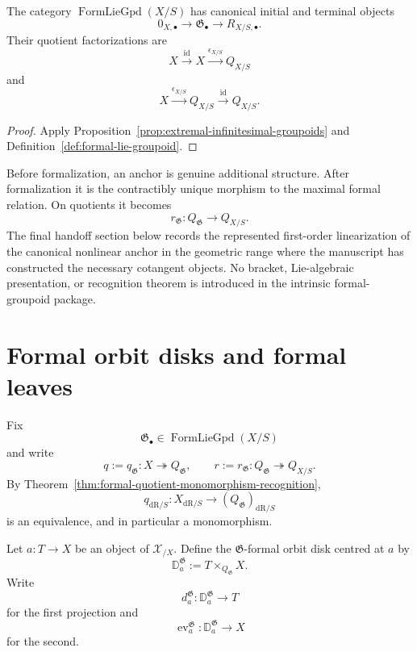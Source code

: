 \begin{corollary}
\label{cor:initial-terminal-formal-gpd}
The category $\operatorname{FormLieGpd}(X/S)$ has canonical initial and
terminal objects
\[
    0_{X,\bullet}
    \longrightarrow
    \mathfrak G_\bullet
    \longrightarrow
    R_{X/S,\bullet}.
\]
Their quotient factorizations are
\[
    X\xrightarrow{\operatorname{id}}X
      \xrightarrow{\epsilon_{X/S}}Q_{X/S}
\]
and
\[
    X\xrightarrow{\epsilon_{X/S}}Q_{X/S}
      \xrightarrow{\operatorname{id}}Q_{X/S}.
\]
\end{corollary}

\begin{proof}
Apply Proposition~\ref{prop:extremal-infinitesimal-groupoids} and
Definition~\ref{def:formal-lie-groupoid}.
\end{proof}

\begin{remark}
\label{rem:nonlinear-anchor}
Before formalization, an anchor is genuine additional structure.  After
formalization it is the contractibly unique morphism to the maximal formal
relation.  On quotients it becomes
\[
    r_{\mathfrak G}:Q_{\mathfrak G}\to Q_{X/S}.
\]
The final handoff section below records the represented first-order
linearization of the canonical nonlinear anchor in the geometric range where
the manuscript has constructed the necessary cotangent objects.  No bracket,
Lie-algebraic presentation, or recognition theorem is introduced in the
intrinsic formal-groupoid package.
\end{remark}


\section{Formal orbit disks and formal leaves}
\label{sec:flg-formal-disks}

Fix
\[
    \mathfrak G_\bullet
    \in
    \operatorname{FormLieGpd}(X/S)
\]
and write
\[
    q:=q_{\mathfrak G}:X\twoheadrightarrow Q_{\mathfrak G},
    \qquad
    r:=r_{\mathfrak G}:Q_{\mathfrak G}\twoheadrightarrow Q_{X/S}.
\]
By Theorem~\ref{thm:formal-quotient-monomorphism-recognition},
\[
    q_{\mathrm{dR}/S}:
    X_{\mathrm{dR}/S}
    \longrightarrow
    (Q_{\mathfrak G})_{\mathrm{dR}/S}
\]
is an equivalence, and in particular a monomorphism.

\begin{definition}
\label{def:formal-orbit-disk}
Let $a:T\to X$ be an object of $\mathcal X_{/X}$.  Define the
$\mathfrak G$-formal orbit disk centred at $a$ by
\[
    \mathbb D^{\mathfrak G}_a
    :=
    T\times_{Q_{\mathfrak G}}X.
\]
Write
\[
    d^{\mathfrak G}_a:
    \mathbb D^{\mathfrak G}_a\to T
\]
for the first projection and
\[
    \operatorname{ev}^{\mathfrak G}_a:
    \mathbb D^{\mathfrak G}_a\to X
\]
for the second.
\end{definition}

